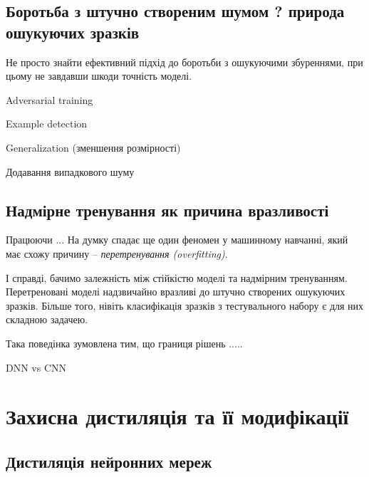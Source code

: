 \documentclass[14pt,a4paper]{extarticle}
\newcounter{e}
\numberwithin{equation}{section}
\numberwithin{figure}{section}
\begin{document}

 
 
 
 \subsection{Боротьба з штучно створеним шумом ? природа ошукуючих зразків}
 Не просто  знайти ефективний підхід до боротьби з ошукуючими збуреннями, при цьому не завдавши шкоди точність моделі.
 
 Adversarial training
 
 Example detection
 
 Generalization (зменшення розмірності)
 
 
 Додавання випадкового шуму
 
  
 \subsection{Надмірне тренування як причина вразливості}
 
 Працюючи ...
 На думку спадає ще один феномен у машинному навчанні, який має схожу причину -- \textit{перетренування (overfitting)}.
 
 І справді, бачимо залежність між стійкістю моделі та надмірним тренуванням. Перетреновані моделі надзвичайно вразливі до штучно створених ошукуючих зразків. Більше того, нівіть класифікація зразків з тестувального набору є для них складною задачею.
 
 Така поведінка зумовлена тим, що границя рішень .....
 
 
 
 \begin{LARGE}
 	DNN vs CNN
 \end{LARGE}
 
 \newpage
 \thispagestyle{empty}
 
 
 \newpage
 \thispagestyle{empty}
 \section{Захисна дистиляція та її модифікації}
 \subsection{Дистиляція нейронних мереж}
 
\end{document}
